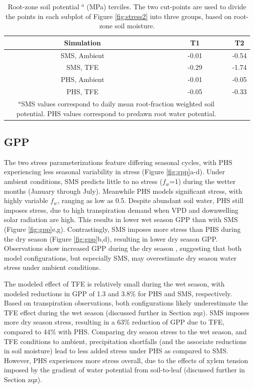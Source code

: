 \documentclass[draft,linenumbers]{agujournal}
\begin{document}
\begin{table}
\caption{Root-zone soil potential $^a$ (MPa) terciles. The two cut-points are used to divide the points in each subplot of Figure \ref{fig:stress2} into three groups, based on root-zone soil moisture.}
\label{tab:tercile}
\centering
\begin{tabular}{c c c }
Simulation & T1 & T2 \\
\hline
SMS, Ambient & -0.01 & -0.54 \\
SMS, TFE & -0.29 & -1.74 \\
PHS, Ambient & -0.01 & -0.05 \\
PHS, TFE & -0.05 & -0.33 \\
\hline
\multicolumn{2}{p{.8\linewidth}}{$^{a}$SMS values correspond to daily mean root-fraction weighted soil potential.
PHS values correspond to predawn root water potential.}
\end{tabular}
\end{table}


\subsection{GPP}

The two stress parameterizations feature differing seasonal cycles, with PHS experiencing less seasonal variability in stress (Figure \ref{fig:gpp}a-d).
Under ambient conditions, SMS predicts little to no stress ($f_w$=1) during the wetter months (January through July).
Meanwhile PHS models significant stress, with highly variable $f_w$, ranging as low as 0.5.
Despite abundant soil water, PHS still imposes stress, due to high transpiration demand when VPD and downwelling solar radiation are high.
This results in lower wet season GPP than with SMS (Figure \ref{fig:gpp}e,g).
Contrastingly, SMS imposes more stress than PHS during the dry season (Figure \ref{fig:gpp}b,d), 
resulting in lower dry season GPP.
Observations show increased GPP during the dry season \citep{restrepo2017}, suggesting that both model configurations, 
but especially SMS, may overestimate dry season water stress under ambient conditions.  

The modeled effect of TFE is relatively small during the wet season, with modeled reductions in GPP of 1.3 and 3.8\% for PHS and SMS, respectively.
Based on transpiration observations, both configurations likely underestimate the TFE effect during the wet season (discussed further in Section zqz).
SMS imposes more dry season stress, resulting in a 63\% reduction of GPP due to TFE, compared to 44\% with PHS.
Comparing dry season stress to the wet season, and TFE conditions to ambient, precipitation shortfalls (and the associate reductions in soil moisture) lead to less added stress under PHS as compared to SMS.
However, PHS experiences more stress overall, due to the effects of xylem tension imposed by the gradient of water potential from soil-to-leaf (discussed further in Section zqz).
\end{document}
